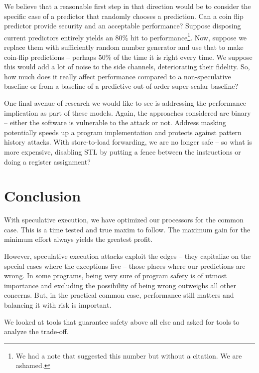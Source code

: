 \documentclass[11pt,conference]{IEEEtran}
\begin{document}
We believe that a reasonable first step in that direction would be to consider the specific case of a predictor that randomly chooses a prediction.
Can a coin flip predictor provide security and an acceptable performance?
Suppose disposing current predictors entirely yields an 80\% hit to performance\footnote{We had a note that suggested this number but without a citation. We are ashamed.}.
Now, suppose we replace them with sufficiently random number generator and use that to make coin-flip predictions -- perhaps 50\% of the time it is right every time.
We suppose this would add a lot of noise to the side channels, deteriorating their fidelity.
So, how much does it really affect performance compared to a non-speculative baseline or from a baseline of a predictive out-of-order super-scalar baseline?

One final avenue of research we would like to see is addressing the performance implication as part of these models.
Again, the approaches considered are binary -- either the software is vulnerable to the attack or not.
Address masking potentially speeds up a program implementation and protects against pattern history attacks.
With store-to-load forwarding, we are no longer safe -- so what is more expensive, disabling STL by putting a fence between the instructions or doing a register assignment?

\section{Conclusion}

With speculative execution, we have optimized our processors for the common case.
This is a time tested and true maxim to follow.
The maximum gain for the minimum effort always yields the greatest profit.

However, speculative execution attacks exploit the edges -- they capitalize on the special cases where the exceptions live -- those places where our predictions are wrong.
In some programs, being very sure of program safety is of utmost importance and excluding the possibility of being wrong outweighs all other concerns.
But, in the practical common case, performance still matters and balancing it with risk is important.

We looked at tools that guarantee safety above all else and asked for tools to analyze the trade-off.



\end{document}
